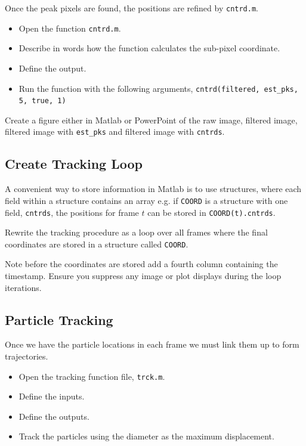\documentclass[12pt,a4paper,twoside]{article}
\begin{document}
Once the peak pixels are found, the positions are refined by \lstinline{cntrd.m}.

\begin{itemize}
    \item Open the function \lstinline{cntrd.m}.
    \item Describe in words how the function calculates the sub-pixel coordinate.
        \vspace{1cm}
    \item Define the output.
        \vspace{1cm}
     \item Run the function with the following arguments, \lstinline{cntrd(filtered, est_pks, 5, true, 1)}
        \vspace{1cm}   
\end{itemize}


Create a figure either in Matlab or PowerPoint of the raw image, filtered image, filtered image with \lstinline{est_pks} and filtered image with \lstinline{cntrds}.

\subsection{Create Tracking Loop}

A convenient way to store information in Matlab is to use structures, where each field within a structure contains an array e.g. if \lstinline{COORD} is a structure with one field, \lstinline{cntrds}, the positions for frame $t$ can be stored in \lstinline{COORD(t).cntrds}.

Rewrite the tracking procedure as a loop over all frames where the final coordinates are stored in a structure called \lstinline{COORD}.

Note before the coordinates are stored add a fourth column containing the timestamp. Ensure you suppress any image or plot displays during the loop iterations.

\subsection{Particle Tracking}

Once we have the particle locations in each frame we must link them up to form trajectories. 

\begin{itemize}
    \item Open the tracking function file, \lstinline{trck.m}.
    \item Define the inputs.
    \vspace{1cm}
    \item Define the outputs.
        \vspace{1cm}
    \item Track the particles using the diameter as the maximum displacement.
\end{itemize}
\end{document}
